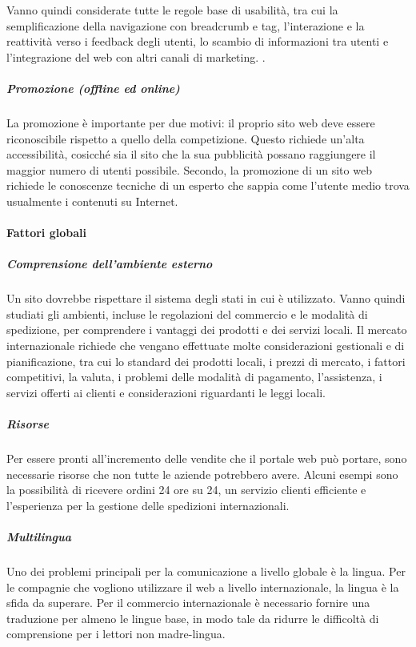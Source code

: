 Vanno quindi considerate tutte le regole base di usabilità, tra cui la semplificazione della navigazione con \gls{breadcrumb} e \gls{tag}, l'interazione e la reattività verso i \gls{feedback} degli utenti, lo scambio di informazioni tra utenti e l'integrazione del web con altri canali di marketing. \autocite{b2bSuccessFactors}.

\subparagraph{Promozione (offline ed online)}
La promozione è importante per due motivi: il proprio sito web deve essere riconoscibile rispetto a quello della competizione. Questo richiede un'alta accessibilità, cosicché sia il sito che la sua pubblicità possano raggiungere il maggior numero di utenti possibile. Secondo, la promozione di un sito web  richiede le conoscenze tecniche di un esperto che sappia come l'utente medio trova usualmente i contenuti su Internet.

\paragraph{Fattori globali}
\subparagraph{Comprensione dell'ambiente esterno}
Un sito dovrebbe rispettare il sistema degli stati in cui è utilizzato. Vanno quindi studiati gli ambienti, incluse le regolazioni del commercio e le modalità di spedizione, per comprendere i vantaggi dei prodotti e dei servizi locali. Il mercato internazionale richiede che vengano effettuate molte considerazioni gestionali e di pianificazione, tra cui lo standard dei prodotti locali, i prezzi di mercato, i fattori competitivi, la valuta, i problemi delle modalità di pagamento, l'assistenza, i servizi offerti ai clienti e considerazioni riguardanti le leggi locali.

\subparagraph{Risorse}
Per essere pronti all'incremento delle vendite che il portale web può portare, sono necessarie risorse che non tutte le aziende potrebbero avere. Alcuni esempi sono la possibilità di ricevere ordini 24 ore su 24, un servizio clienti efficiente e l'esperienza per la gestione delle spedizioni internazionali.

\subparagraph{Multilingua}
Uno dei problemi principali per la comunicazione a livello globale è la lingua. Per le compagnie che vogliono utilizzare il web a livello internazionale, la lingua è la sfida da superare. Per il commercio internazionale è necessario fornire una traduzione per almeno le lingue base, in modo tale da ridurre le difficoltà di comprensione per i lettori non madre-lingua.

